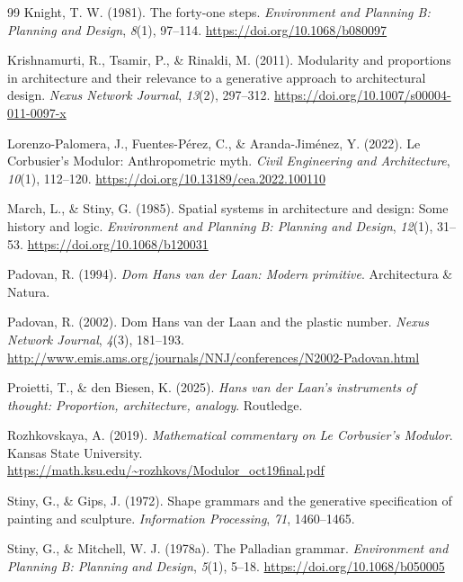\documentclass[10pt,twocolumn]{article}
\begin{document}
\begin{thebibliography}{99}
Knight, T. W. (1981). The forty-one steps. \emph{Environment and Planning B: Planning and Design}, \emph{8}(1), 97--114. \url{https://doi.org/10.1068/b080097}

Krishnamurti, R., Tsamir, P., \& Rinaldi, M. (2011). Modularity and proportions in architecture and their relevance to a generative approach to architectural design. \emph{Nexus Network Journal}, \emph{13}(2), 297--312. \url{https://doi.org/10.1007/s00004-011-0097-x}

Lorenzo-Palomera, J., Fuentes-P\'erez, C., \& Aranda-Jim\'enez, Y. (2022). Le Corbusier's Modulor: Anthropometric myth. \emph{Civil Engineering and Architecture}, \emph{10}(1), 112--120. \url{https://doi.org/10.13189/cea.2022.100110}

March, L., \& Stiny, G. (1985). Spatial systems in architecture and design: Some history and logic. \emph{Environment and Planning B: Planning and Design}, \emph{12}(1), 31--53. \url{https://doi.org/10.1068/b120031}

Padovan, R. (1994). \emph{Dom Hans van der Laan: Modern primitive}. Architectura \& Natura.

Padovan, R. (2002). Dom Hans van der Laan and the plastic number. \emph{Nexus Network Journal}, \emph{4}(3), 181--193. \url{http://www.emis.ams.org/journals/NNJ/conferences/N2002-Padovan.html}

Proietti, T., \& den Biesen, K. (2025). \emph{Hans van der Laan's instruments of thought: Proportion, architecture, analogy}. Routledge.

Rozhkovskaya, A. (2019). \emph{Mathematical commentary on Le Corbusier's Modulor}. Kansas State University. \url{https://math.ksu.edu/~rozhkovs/Modulor_oct19final.pdf}

Stiny, G., \& Gips, J. (1972). Shape grammars and the generative specification of painting and sculpture. \emph{Information Processing}, \emph{71}, 1460--1465.

Stiny, G., \& Mitchell, W. J. (1978a). The Palladian grammar. \emph{Environment and Planning B: Planning and Design}, \emph{5}(1), 5--18. \url{https://doi.org/10.1068/b050005}


\end{thebibliography}
\end{document}
